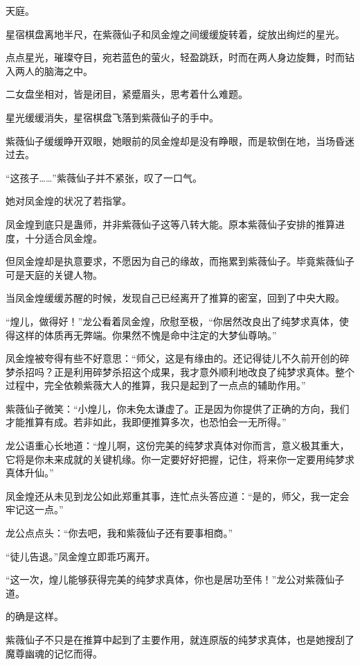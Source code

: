 
\begin{this_body}

天庭。

星宿棋盘离地半尺，在紫薇仙子和凤金煌之间缓缓旋转着，绽放出绚烂的星光。

点点星光，璀璨夺目，宛若蓝色的萤火，轻盈跳跃，时而在两人身边旋舞，时而钻入两人的脑海之中。

二女盘坐相对，皆是闭目，紧蹙眉头，思考着什么难题。

星光缓缓消失，星宿棋盘飞落到紫薇仙子的手中。

紫薇仙子缓缓睁开双眼，她眼前的凤金煌却是没有睁眼，而是软倒在地，当场昏迷过去。

“这孩子……”紫薇仙子并不紧张，叹了一口气。

她对凤金煌的状况了若指掌。

凤金煌到底只是蛊师，并非紫薇仙子这等八转大能。原本紫薇仙子安排的推算进度，十分适合凤金煌。

但凤金煌却是执意要求，不愿因为自己的缘故，而拖累到紫薇仙子。毕竟紫薇仙子可是天庭的关键人物。

当凤金煌缓缓苏醒的时候，发现自己已经离开了推算的密室，回到了中央大殿。

“煌儿，做得好！”龙公看着凤金煌，欣慰至极，“你居然改良出了纯梦求真体，使得这样的体质再无弊端。你果然不愧是命中注定的大梦仙尊呐。”

凤金煌被夸得有些不好意思：“师父，这是有缘由的。还记得徒儿不久前开创的碎梦杀招吗？正是利用碎梦杀招这个成果，我才意外顺利地改良了纯梦求真体。整个过程中，完全依赖紫薇大人的推算，我只是起到了一点点的辅助作用。”

紫薇仙子微笑：“小煌儿，你未免太谦虚了。正是因为你提供了正确的方向，我们才能推算有成。若非如此，我即便推算多次，也恐怕会一无所得。”

龙公语重心长地道：“煌儿啊，这份完美的纯梦求真体对你而言，意义极其重大，它将是你未来成就的关键机缘。你一定要好好把握，记住，将来你一定要用纯梦求真体升仙。”

凤金煌还从未见到龙公如此郑重其事，连忙点头答应道：“是的，师父，我一定会牢记这一点。”

龙公点点头：“你去吧，我和紫薇仙子还有要事相商。”

“徒儿告退。”凤金煌立即乖巧离开。

“这一次，煌儿能够获得完美的纯梦求真体，你也是居功至伟！”龙公对紫薇仙子道。

的确是这样。

紫薇仙子不只是在推算中起到了主要作用，就连原版的纯梦求真体，也是她搜刮了魔尊幽魂的记忆而得。


\end{this_body}
